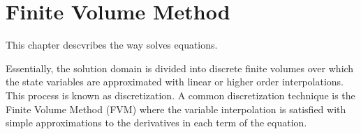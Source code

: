\chapter{Finite Volume Method}

This chapter descvribes the way \FiPy{} solves equations.

Essentially, the solution domain is divided into discrete finite
volumes over which the state variables are approximated with linear or
higher order interpolations. This process is known as discretization.
A common discretization technique is the Finite Volume Method (FVM)
where the variable interpolation is satisfied with simple
approximations to the derivatives in each term of the equation.







